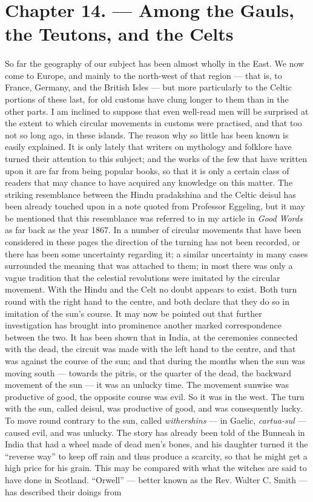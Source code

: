 \documentclass[a4paper, 11pt, oneside, polutonikogreek, english]{article}
\begin{document}
\section{Chapter 14. --- Among the Gauls, the Teutons, and the Celts}
\paragraph{}
So far the geography of our subject has been almost wholly in the East. We now come to Europe, and mainly to the north-west of that region --- that is, to France, Germany, and the British Isles --- but more particularly to the Celtic portions of these last, for old customs have clung longer to them than in the other parts. I am inclined to suppose that even well-read men will be surprised at the extent to which circular movements in customs were practised, and that too not so long ago, in these islands. The reason why so little has been known is easily explained. It is only lately that writers on mythology and folklore have turned their attention to this subject; and the works of the few that have written upon it are far from being popular books, so that it is only a certain class of readers that may chance to have acquired any knowledge on this matter. The striking resemblance between the Hindu pradakshina and the Celtic deisul has been already touched upon in a note quoted from Professor Eggeling, but it may be mentioned that this resemblance was referred to in my article in \emph{Good Words} as far back as the year 1867. In a number of circular movements that have been considered in these pages the direction of the turning has not been recorded, or there has been some uncertainty regarding it; a similar uncertainty in many cases surrounded the meaning that was attached to them; in most there was only a vague tradition that the celestial revolutions were imitated by the circular movement. With the Hindu and the Celt no doubt appears to exist. Both turn round with the right hand to the centre, and both declare that they do so in imitation of the sun's course. It may now be pointed out that further investigation has brought into prominence another marked correspondence between the two. It has been shown that in India, at the ceremonies connected with the dead, the circuit was made with the left hand to the centre, and that was against the course of the sun; and that during the months when the sun was moving south --- towards the pitris, or the quarter of the dead, the backward movement of the sun --- it was an unlucky time. The movement sunwise was productive of good, the opposite course was evil. So it was in the west. The turn with the sun, called deisul, was productive of good, and was consequently lucky. To move round contrary to the sun, called \emph{withershins} --- in Gaelic, \emph{cartua-sul} --- caused evil, and was unlucky. The story has already been told of the Bunneah in India that had a wheel made of dead men's bones, and his daughter turned it the ``reverse way'' to keep off rain and thus produce a scarcity, so that he might get a high price for his grain. This may be compared with what the witches are said to have done in Scotland. ``Orwell'' --- better known as the Rev. Walter C. Smith --- has described their doings from 
\end{document}
